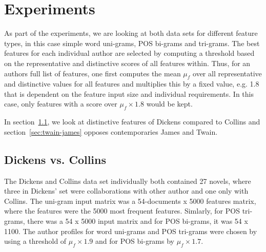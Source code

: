 \documentclass[a4paper,10pt,twoside,fleqn]{article}
\begin{document}
\section{Experiments}\label{sec:experiments}
As part of the experiments, we are looking at both data sets
for different feature types, in this case simple word uni-grams,
POS bi-grams and tri-grams. 
The best features for each individual author are selected by 
computing a threshold based on the representative and distinctive
scores of all features within. 
Thus, for an authors full list of features, one first computes 
the mean $\mu_f$ over all representative and distinctive values 
for all features and multiplies this by a fixed value, e.g. 1.8
that is dependent on the feature input size and individual
requirements. In this case, only features with a score over
$\mu_f \times 1.8$ would be kept. 

In section~\ref{sec:dickens-collins}, we look at distinctive
features of Dickens compared to Collins and section~\ref{sec:twain-james}
opposes contemporaries James and Twain. 

\subsection{Dickens vs. Collins} \label{sec:dickens-collins}
The Dickens and Collins data set individually both contained 27 novels,
where three in Dickens' set were collaborations with other author and 
one only with Collins. The uni-gram input matrix was a 
54-documents x 5000 features matrix, where the features were 
the 5000 most frequent features. 
Simlarly, for POS tri-grams, there was a 54 x 5000 input matrix and
for POS bi-grams, it was 54 x 1100. 
The author profiles for word uni-grams and POS tri-grams were chosen
by using a threshold of $\mu_f \times 1.9$ and for
POS bi-grams by $\mu_f \times 1.7$. 
\end{document}
